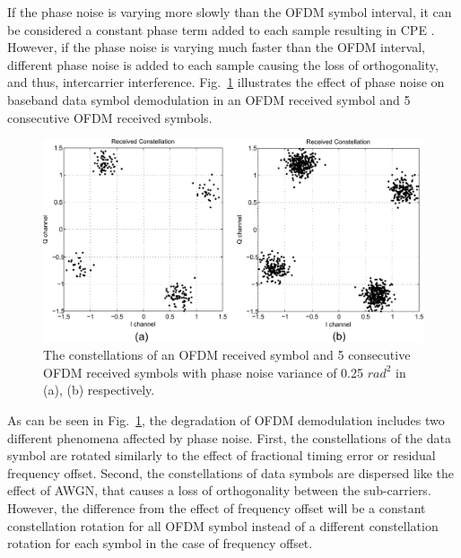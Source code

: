 If the phase noise is varying more slowly than the OFDM symbol interval, it can be considered a constant phase term added to each sample resulting in CPE \cite{Armada1998}. 
However, if the phase noise is varying much faster than the OFDM interval, different phase noise is added to each sample causing the loss of orthogonality, and thus, intercarrier interference.  
Fig.~\ref{fig:phasenoise} illustrates the effect of phase noise on baseband data symbol demodulation in an OFDM received symbol and 5 consecutive OFDM received symbols.
\begin{figure}
	\centerline{\includegraphics [width=0.8\columnwidth] {Figures/phasenoise.pdf} }
	\caption{The constellations of an OFDM received symbol and 5 consecutive OFDM received symbols with phase noise variance of 0.25 $rad^2$ in (a), (b) respectively.}
	\label{fig:phasenoise}
\end{figure}

As can be seen in Fig.~\ref{fig:phasenoise}, the degradation of OFDM demodulation includes two different phenomena affected by phase noise.
First, the constellations of the data symbol are rotated similarly to the effect of fractional timing error or residual frequency offset.
Second, the constellations of data symbols are dispersed like the effect of AWGN, that causes a loss of orthogonality between the sub-carriers.
However, the difference from the effect of frequency offset will be a constant constellation rotation for all OFDM symbol instead of a different constellation rotation for each symbol in the case of  frequency offset.


